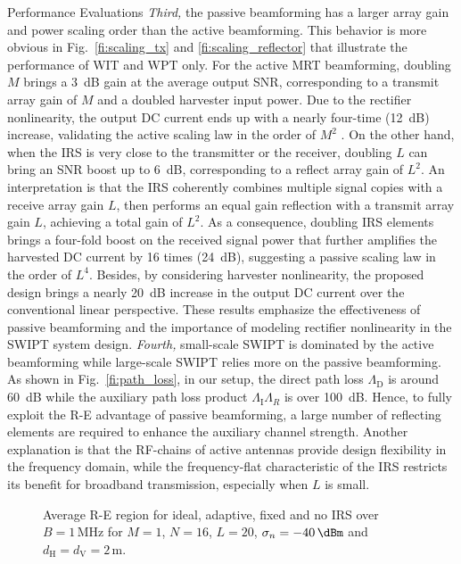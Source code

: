 \documentclass[journal]{IEEEtran}
\begin{document}
\begin{section}{Performance Evaluations}
		\textit{Third,} the passive beamforming has a larger array gain and power scaling order than the active beamforming. This behavior is more obvious in Fig.~\ref{fi:scaling_tx} and \ref{fi:scaling_reflector} that illustrate the performance of WIT and WPT only. For the active MRT beamforming, doubling $M$ brings a \SI{3}{\dB} gain at the average output SNR, corresponding to a transmit array gain of $M$ and a doubled harvester input power. Due to the rectifier nonlinearity, the output DC current ends up with a nearly four-time (\SI{12}{\dB}) increase, validating the active scaling law in the order of $M^2$ \cite{Clerckx2016a}. On the other hand, when the IRS is very close to the transmitter or the receiver, doubling $L$ can bring an SNR boost up to \SI{6}{\dB}, corresponding to a reflect array gain of $L^2$. An interpretation is that the IRS coherently combines multiple signal copies with a receive array gain $L$, then performs an equal gain reflection with a transmit array gain $L$, achieving a total gain of $L^2$. As a consequence, doubling IRS elements brings a four-fold boost on the received signal power that further amplifies the harvested DC current by 16 times (\SI{24}{\dB}), suggesting a passive scaling law in the order of $L^4$. Besides, by considering harvester nonlinearity, the proposed design brings a nearly \SI{20}{\dB} increase in the output DC current over the conventional linear perspective. These results emphasize the effectiveness of passive beamforming and the importance of modeling rectifier nonlinearity in the SWIPT system design. \textit{Fourth,} small-scale SWIPT is dominated by the active beamforming while large-scale SWIPT relies more on the passive beamforming. As shown in Fig.~\ref{fi:path_loss}, in our setup, the direct path loss $\Lambda_\mathrm{D}$ is around \SI{60}{\dB} while the auxiliary path loss product $\Lambda_{\mathrm{I}}\Lambda_R$ is over \SI{100}{\dB}. Hence, to fully exploit the R-E advantage of passive beamforming, a large number of reflecting elements are required to enhance the auxiliary channel strength. Another explanation is that the RF-chains of active antennas provide design flexibility in the frequency domain, while the frequency-flat characteristic of the IRS restricts its benefit for broadband transmission, especially when $L$ is small.
		\begin{figure}[!t]
			\centering
			\begin{adjustbox}{width=0.9\columnwidth}
				
			\end{adjustbox}
			\caption{Average R-E region for ideal, adaptive, fixed and no IRS over $B=1\,\si{\MHz}$ for $M=1$, $N=16$, $L=20$, $\sigma_n=-40\,\si{\dBm}$ and $d_{\mathrm{H}}=d_{\mathrm{V}}=2\,\si{\meter}$.}
			\label{fi:re_irs_1mhz}
		\end{figure}


\end{section}
\end{document}
